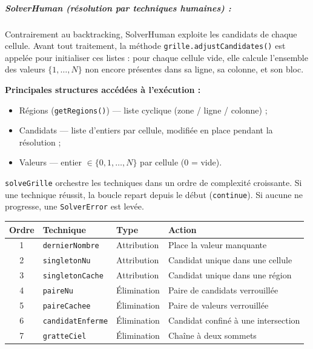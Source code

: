 \documentclass[a4paper]{article}
\begin{document}
\subparagraph{SolverHuman (résolution par techniques humaines) :}

Contrairement au backtracking, SolverHuman exploite les candidats de chaque
cellule. Avant tout traitement, la méthode \texttt{grille.adjustCandidates()} est appelée
pour initialiser ces listes : pour chaque cellule vide, elle calcule l'ensemble des valeurs
$\{1, \ldots, N\}$ non encore présentes dans sa ligne, sa colonne, et son bloc.

\medskip
\textbf{Principales structures accédées à l'exécution :}

\begin{itemize}[noitemsep]
  \item Régions (\texttt{getRegions()}) — liste cyclique (zone / ligne / colonne) ;
  \item Candidats — liste d'entiers par cellule, modifiée en place pendant la résolution ;
  \item Valeurs — entier $\in \{0, 1, \ldots, N\}$ par cellule ($0$ = vide).
\end{itemize}

\texttt{solveGrille} orchestre les techniques dans un ordre de complexité croissante.
Si une technique réussit, la boucle repart depuis le début (\texttt{continue}).
Si aucune ne progresse, une \texttt{SolverError} est levée.

\begin{center}
\renewcommand{\arraystretch}{1.3}
\begin{tabular}{clll}
  \toprule
  \textbf{Ordre} & \textbf{Technique} & \textbf{Type} & \textbf{Action} \\
  \midrule
  1 & \texttt{dernierNombre}    & Attribution & Place la valeur manquante \\
  2 & \texttt{singletonNu}      & Attribution & Candidat unique dans une cellule \\
  3 & \texttt{singletonCache}   & Attribution & Candidat unique dans une région \\
  4 & \texttt{paireNu}          & Élimination & Paire de candidats verrouillée \\
  5 & \texttt{paireCachee}      & Élimination & Paire de valeurs verrouillée \\
  6 & \texttt{candidatEnferme}  & Élimination & Candidat confiné à une intersection \\
  7 & \texttt{gratteCiel}       & Élimination & Chaîne à deux sommets \\
  \bottomrule
\end{tabular}
\end{center}
\end{document}
